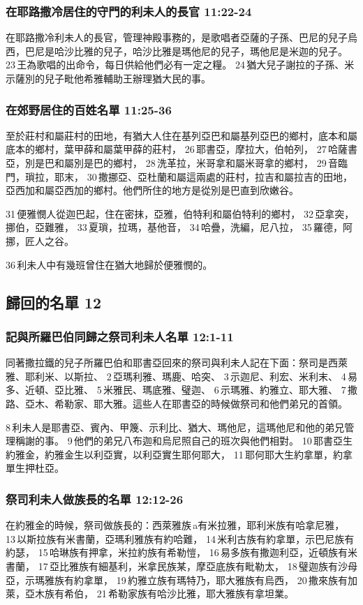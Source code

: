 \subsubsection{在耶路撒冷居住的守門的利未人的長官 11:22-24}
在耶路撒冷利未人的長官，管理神殿事務的，是歌唱者亞薩的子孫、巴尼的兒子烏西，巴尼是哈沙比雅的兒子，哈沙比雅是瑪他尼的兒子，瑪他尼是米迦的兒子。 23 王為歌唱的出命令，每日供給他們必有一定之糧。 24 猶大兒子謝拉的子孫、米示薩別的兒子毗他希雅輔助王辦理猶大民的事。

\subsubsection{在郊野居住的百姓名單 11:25-36}
至於莊村和屬莊村的田地，有猶大人住在基列亞巴和屬基列亞巴的鄉村，底本和屬底本的鄉村，葉甲薛和屬葉甲薛的莊村， 26 耶書亞，摩拉大，伯帕列， 27 哈薩書亞，別是巴和屬別是巴的鄉村， 28 洗革拉，米哥拿和屬米哥拿的鄉村， 29 音臨門，瑣拉，耶末， 30 撒挪亞、亞杜蘭和屬這兩處的莊村，拉吉和屬拉吉的田地，亞西加和屬亞西加的鄉村。他們所住的地方是從別是巴直到欣嫩谷。

 31 便雅憫人從迦巴起，住在密抹，亞雅，伯特利和屬伯特利的鄉村， 32 亞拿突，挪伯，亞難雅， 33 夏瑣，拉瑪，基他音， 34 哈疊，洗編，尼八拉， 35 羅德，阿挪，匠人之谷。 

36 利未人中有幾班曾住在猶大地歸於便雅憫的。

\subsection{歸回的名單 12}
\subsubsection{記與所羅巴伯同歸之祭司利未人名單 12:1-11}
同著撒拉鐵的兒子所羅巴伯和耶書亞回來的祭司與利未人記在下面：祭司是西萊雅、耶利米、以斯拉、 2 亞瑪利雅、瑪鹿、哈突、 3 示迦尼、利宏、米利末、 4 易多、近頓、亞比雅、 5 米雅民、瑪底雅、璧迦、 6 示瑪雅、約雅立、耶大雅、 7 撒路、亞木、希勒家、耶大雅。這些人在耶書亞的時候做祭司和他們弟兄的首領。

8 利未人是耶書亞、賓內、甲篾、示利比、猶大、瑪他尼，這瑪他尼和他的弟兄管理稱謝的事。 9 他們的弟兄八布迦和烏尼照自己的班次與他們相對。 10 耶書亞生約雅金，約雅金生以利亞實，以利亞實生耶何耶大， 11 耶何耶大生約拿單，約拿單生押杜亞。

\subsubsection{祭司利未人做族長的名單 12:12-26}
在約雅金的時候，祭司做族長的：西萊雅族 a有米拉雅，耶利米族有哈拿尼雅， 13 以斯拉族有米書蘭，亞瑪利雅族有約哈難， 14 米利古族有約拿單，示巴尼族有約瑟， 15 哈琳族有押拿，米拉約族有希勒愷， 16 易多族有撒迦利亞，近頓族有米書蘭， 17 亞比雅族有細基利，米拿民族某，摩亞底族有毗勒太， 18 璧迦族有沙母亞，示瑪雅族有約拿單， 19 約雅立族有瑪特乃，耶大雅族有烏西， 20 撒來族有加萊，亞木族有希伯， 21 希勒家族有哈沙比雅，耶大雅族有拿坦業。

